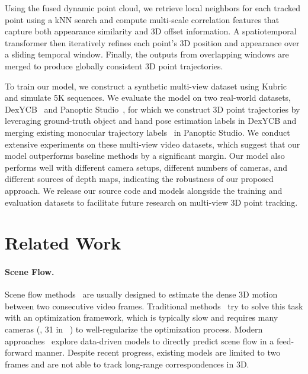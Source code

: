\documentclass[10pt,twocolumn,letterpaper]{article}
\begin{document}
Using the fused dynamic point cloud, we retrieve local neighbors for each tracked point using a kNN search and compute multi-scale correlation features that capture both appearance similarity and 3D offset information. A spatiotemporal transformer then iteratively refines each point's 3D position and appearance over a sliding temporal window. Finally, the outputs from overlapping windows are merged to produce globally consistent 3D point trajectories. 

To train our model, we construct a synthetic multi-view dataset using Kubric~\cite{greff2022kubric} and simulate 5K sequences. We evaluate the model on two real-world datasets, DexYCB~\cite{dexycb} and Panoptic Studio~\cite{joo2015panoptic}, for which we construct 3D point trajectories by leveraging ground-truth object and hand pose estimation labels in DexYCB and merging existing monocular trajectory labels~\cite{koppula2024tapvid} in Panoptic Studio. We conduct extensive experiments on these multi-view video datasets, which suggest that our model outperforms baseline methods by a significant margin. Our model also performs well with different camera setups, different numbers of cameras, and different sources of depth maps, indicating the robustness of our proposed approach. We release our source code and models alongside the training and evaluation datasets to facilitate future research on multi-view 3D point tracking.

\section{Related Work}
\label{sec:related_work}

\paragraph{Scene Flow.}
Scene flow methods~\cite{vedula1999three,richardt2016dense,vogel20113d,teed2021raft} are usually designed to estimate the dense 3D motion between two consecutive video frames. Traditional methods~\cite{vedula1999three,richardt2016dense,vogel20113d} try to solve this task with an optimization framework, which is typically slow and requires many cameras (\eg, 31 in ~\cite{vedula1999three}) to well-regularize the optimization process. Modern approaches~\cite{yang2020upgrading,teed2021raft,liu2022camliflow} explore data-driven models to directly predict scene flow in a feed-forward manner. Despite recent progress, existing models are limited to two frames and are not able to track long-range correspondences in 3D.
\end{document}
